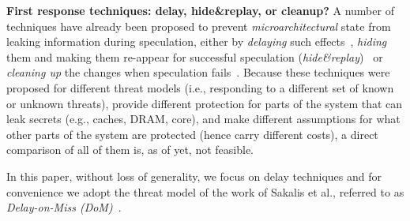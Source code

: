 \noindent \textbf{First response techniques: delay, hide\&replay, or cleanup?}
A number of techniques have already been proposed to prevent \emph{microarchitectural} state from leaking information during speculation, either by %
\emph{delaying} such effects~\cite{sakalis+:ISCA2019vp,weisse2019nda,yu_speculative:MICRO2019-STT, fustos+:DAC2019spectreguard}, %
\emph{hiding} them and making them re-appear for successful speculation (\emph{hide\&replay})~\cite{yan_invisispec:MICRO2018,sakalis+:CF2019ghost} or %
\emph{cleaning up} the changes when speculation fails~\cite{saileshwar2019cleanupspec}. %
Because these techniques were proposed for different threat models (i.e.,  responding to a different set of known or unknown threats), provide different protection for parts of the system that can leak secrets (e.g., caches, DRAM, core), and make different assumptions for what other parts of the system are protected (hence carry different costs), a direct comparison of all of them is, as of yet, not feasible.
In this paper, without loss of generality, we focus on delay techniques and for convenience we adopt the threat model of the work of Sakalis et al., referred to as \emph{Delay-on-Miss  (DoM)}~\cite{sakalis+:ISCA2019vp}. 
